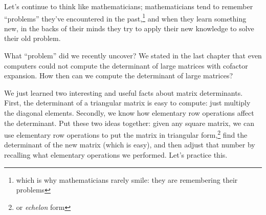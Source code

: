 Let's continue to think like mathematicians; mathematicians tend to remember ``problems'' they've encountered in the past,\footnote{which is why mathematicians rarely smile: they are remembering their problems} and when they learn something new, in the backs of their minds they try to apply their new knowledge to solve their old problem.

What ``problem'' did we recently uncover? We stated in the last chapter that even computers could not compute the determinant of large matrices with cofactor expansion. How then can we compute the determinant of large matrices?

We just learned two interesting and useful facts about matrix determinants. First, the determinant of a triangular matrix is easy to compute: just multiply the diagonal elements. Secondly, we know how elementary row operations affect the determinant. Put these two ideas together: given any square matrix, we can use elementary row operations to put the matrix in triangular form,\footnote{or {\em echelon} form} find the determinant of the new matrix (which is easy), and then adjust that number by recalling what elementary operations we performed. Let's practice this.\\

